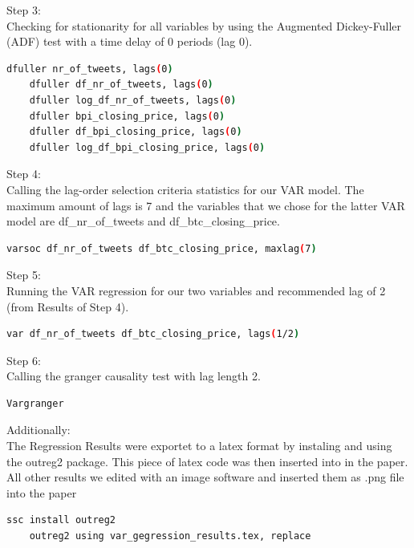 \documentclass[a4paper,12pt]{article}
\begin{document}
\begin{spacing}{1.2}
\smallskip Step 3:\\
Checking for stationarity for all variables by using the Augmented Dickey-Fuller (ADF) test with a time delay of 0 periods (lag 0).\\
	\begin{lstlisting}[language=bash]
	dfuller nr_of_tweets, lags(0)
	dfuller df_nr_of_tweets, lags(0)
	dfuller log_df_nr_of_tweets, lags(0)
	dfuller bpi_closing_price, lags(0)
	dfuller df_bpi_closing_price, lags(0)
	dfuller log_df_bpi_closing_price, lags(0)
	\end{lstlisting}

\smallskip Step 4:\\
Calling the lag-order selection criteria statistics for our VAR model. The maximum amount of lags is 7 and the variables that we chose for the latter VAR model are df\_nr\_of\_tweets and df\_btc\_closing\_price.\\
	\begin{lstlisting}[language=bash]
	varsoc df_nr_of_tweets df_btc_closing_price, maxlag(7)
	\end{lstlisting}

\smallskip Step 5:\\
Running the VAR regression for our two variables and recommended lag of 2 (from Results of Step 4).\\
	\begin{lstlisting}[language=bash]
	var df_nr_of_tweets df_btc_closing_price, lags(1/2)
	\end{lstlisting}

\smallskip Step 6:\\
Calling the granger causality test with lag length 2.\\
	\begin{lstlisting}[language=bash]
	Vargranger
	\end{lstlisting}

\smallskip Additionally:\\
The Regression Results were exportet to a latex format by instaling and using the outreg2 package. This piece of latex code was then inserted into in the paper. All other results we edited with an image software and inserted them as .png file into the paper\\
	\begin{lstlisting}[language=bash]
	ssc install outreg2
	outreg2 using var_gegression_results.tex, replace
	\end{lstlisting}

\end{spacing}
\clearpage

\printbibliography
\clearpage

\end{document}
